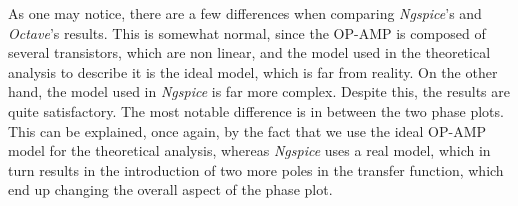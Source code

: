 As one may notice, there are a few differences when comparing \textit{Ngspice}'s and \textit{Octave}'s results.
This is somewhat normal, since the OP-AMP is composed of several transistors, which are non linear, and the model 
used in the theoretical analysis to describe it is the ideal model, which is far from reality. On the other hand,
the model used in \textit{Ngspice} is far more complex. Despite this, the results are quite satisfactory. 
The most notable difference is in between the two phase plots. This can be explained, once again, by the fact that
we use the ideal OP-AMP model for the theoretical analysis, whereas \emph{Ngspice} uses a real model, which in
turn results in the introduction of two more poles in the transfer function, which end up changing the overall aspect
of the phase plot.